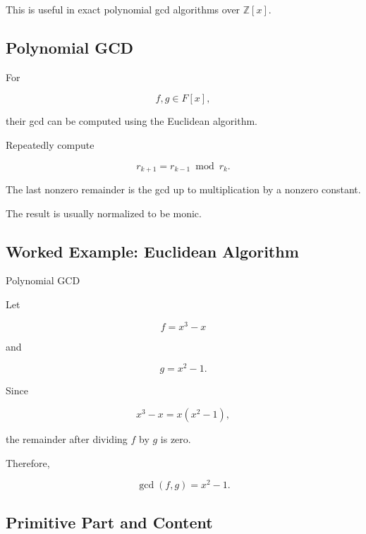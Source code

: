 This is useful in exact polynomial gcd algorithms over \(\mathbb{Z}[x]\).

\subsection{Polynomial GCD}
\label{subsec:computer-algebra-polynomial-gcd}

For

\[
f,g\in F[x],
\]

their gcd can be computed using the Euclidean algorithm.

Repeatedly compute

\[
\boxed{
r_{k+1}
=
r_{k-1}
\bmod
r_k.
}
\]

The last nonzero remainder is the gcd up to multiplication by a nonzero
constant.

The result is usually normalized to be monic.

\subsection{Worked Example: Euclidean Algorithm}
\label{subsec:worked-polynomial-euclidean}

\begin{workedexamplebox}{Polynomial GCD}

Let

\[
f=x^3-x
\]

and

\[
g=x^2-1.
\]

Since

\[
x^3-x
=
x(x^2-1),
\]

the remainder after dividing \(f\) by \(g\) is zero.

Therefore,

\begin{answerbox}
\[
\boxed{
\gcd(f,g)
=
x^2-1.
}
\]
\end{answerbox}

\end{workedexamplebox}

\subsection{Primitive Part and Content}
\label{subsec:primitive-part-content}

